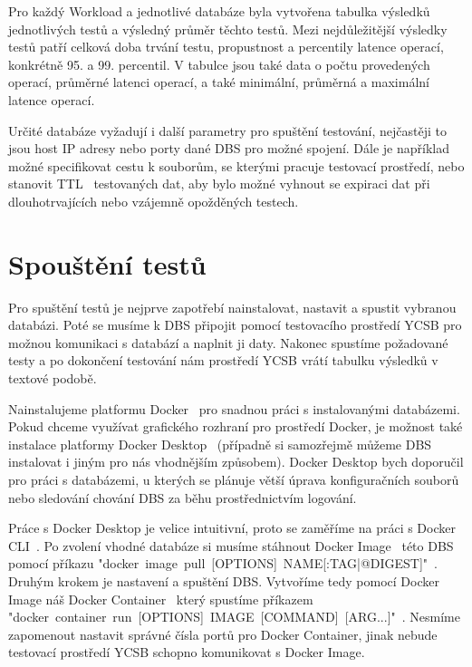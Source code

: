 \documentclass[czech,master,dept460,male,csharp,cpdeclaration]{diploma}
\begin{document}
	Pro každý Workload a jednotlivé databáze byla vytvořena tabulka výsledků jednotlivých testů a výsledný průměr těchto testů. Mezi nejdůležitější výsledky testů patří celková doba trvání testu, propustnost a percentily latence operací, konkrétně 95. a 99. percentil. V tabulce jsou také data o počtu provedených operací, průměrné latenci operací, a také minimální, průměrná a maximální latence operací.
	
	Určité databáze vyžadují i další parametry pro spuštění testování, nejčastěji to jsou host IP adresy nebo porty dané DBS pro možné spojení. Dále je například možné specifikovat cestu k souborům, se kterými pracuje testovací prostředí, nebo stanovit TTL~\cite{ttl} testovaných dat, aby bylo možné vyhnout se expiraci dat při dlouhotrvajících nebo vzájemně opožděných testech.
	
	\section{Spouštění testů}
	
	Pro spuštění testů je nejprve zapotřebí nainstalovat, nastavit a spustit vybranou databázi. Poté se musíme k DBS připojit pomocí testovacího prostředí YCSB pro možnou komunikaci s databází a naplnit ji daty. Nakonec spustíme požadované testy a po dokončení testování nám prostředí YCSB vrátí tabulku výsledků v textové podobě.
	
	Nainstalujeme platformu Docker~\cite{docker-console} pro snadnou práci s instalovanými databázemi. Pokud chceme využívat grafického rozhraní pro prostředí Docker, je možnost také instalace platformy Docker Desktop~\cite{docker-desktop, docker-cli} (případně si samozřejmě můžeme DBS instalovat i jiným pro nás vhodnějším způsobem). Docker Desktop bych doporučil pro práci s databázemi, u kterých se plánuje větší úprava konfiguračních souborů nebo sledování chování DBS za běhu prostřednictvím logování.
	
	Práce s Docker Desktop je velice intuitivní, proto se zaměříme na práci s Docker CLI~\cite{docker-cli}. Po zvolení vhodné databáze si musíme stáhnout Docker Image~\cite{docker-image-container} této DBS~\cite{docker-hub} pomocí příkazu "docker~image~pull~[OPTIONS]~NAME[:TAG|@DIGEST]"~\cite{docker-image-pull}. Druhým krokem je nastavení a spuštění DBS. Vytvoříme tedy pomocí Docker Image náš Docker Container~\cite{docker-image-container} který spustíme příkazem "docker~container~run~[OPTIONS]~IMAGE~[COMMAND]~[ARG...]"~\cite{docker-container-run}. Nesmíme zapomenout nastavit správné čísla portů pro Docker Container, jinak nebude testovací prostředí YCSB schopno komunikovat s Docker Image. 
	
\end{document}

